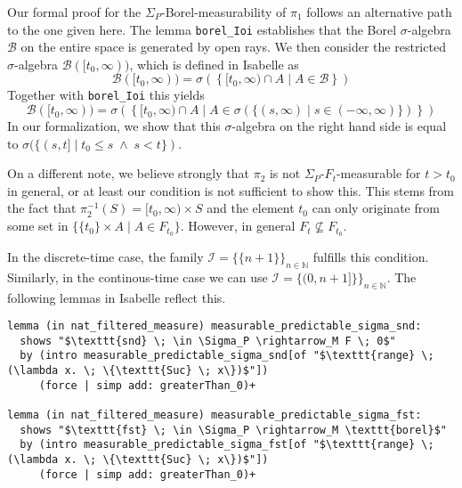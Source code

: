 \begin{remark}
	Our formal proof for the $\Sigma_P$-Borel-measurability of $\pi_1$ follows an alternative path to the one given here. The lemma \texttt{borel\_Ioi} establishes that the Borel $\sigma$-algebra  $\mathcal{B}$ on the entire space is generated by open rays. We then consider the restricted $\sigma$-algebra $\mathcal{B}([t_0,\infty))$, which is defined in Isabelle as
	\[
		\mathcal{B}([t_0,\infty)) = \sigma\left(\left\{[t_0, \infty) \cap A \;\vert\; A \in \mathcal{B}\right\}\right)
	\]
	Together with \texttt{borel\_Ioi} this yields
	\[
	 	\mathcal{B}([t_0,\infty)) = \sigma\left(\left\{[t_0, \infty) \cap A \;\vert\; A \in \sigma(\{(s,\infty) \;\vert\; s \in (-\infty,\infty)\})\right\}\right)
	\]
	In our formalization, we show that this $\sigma$-algebra on the right hand side is equal to $\sigma(\{(s,t] \;\vert\; t_0 \le s \;\wedge\; s < t\})$.
	
	On a different note, we believe strongly that $\pi_2$ is not $\Sigma_P$-$F_t$-measurable for $t > t_0$ in general, or at least our condition is not sufficient to show this. This stems from the fact that $\pi_2^{-1}(S) = [t_0, \infty) \times S$ and the element $t_0$ can only originate from some set in $\{\{t_0\} \times A \;\vert\; A \in F_{t_0}\}$. However, in general $F_t \not\subseteq F_{t_0}$.
\end{remark}

In the discrete-time case, the family $\mathcal{I} = \{\{n + 1\}\}_{n \in \mathbb{N}}$ fulfills this condition. Similarly, in the continous-time case we can use $\mathcal{I} = \{(0,n + 1]\}\}_{n \in \mathbb{N}}$. The following lemmas in Isabelle reflect this.

\begin{isalemma}
{\small
\begin{lstlisting}[style=isabelle]
lemma (in nat_filtered_measure) measurable_predictable_sigma_snd:
  shows "$\texttt{snd} \; \in \Sigma_P \rightarrow_M F \; 0$"
  by (intro measurable_predictable_sigma_snd[of "$\texttt{range} \; (\lambda x. \; \{\texttt{Suc} \; x\})$"]) 
	 (force | simp add: greaterThan_0)+

lemma (in nat_filtered_measure) measurable_predictable_sigma_fst:
  shows "$\texttt{fst} \; \in \Sigma_P \rightarrow_M \texttt{borel}$"
  by (intro measurable_predictable_sigma_fst[of "$\texttt{range} \; (\lambda x. \; \{\texttt{Suc} \; x\})$"]) 
	 (force | simp add: greaterThan_0)+
\end{lstlisting}
}
\end{isalemma}

